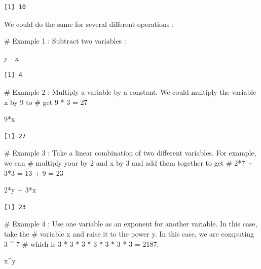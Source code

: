 \documentclass[
  letterpaper,
  DIV=11,
  numbers=noendperiod]{scrreprt}
\newenvironment{Shaded}{\begin{snugshade}}{\end{snugshade}}
\newcommand{\CommentTok}[1]{\textcolor[rgb]{0.37,0.37,0.37}{#1}}
\newcommand{\DecValTok}[1]{\textcolor[rgb]{0.68,0.00,0.00}{#1}}
\newcommand{\NormalTok}[1]{\textcolor[rgb]{0.00,0.23,0.31}{#1}}
\newcommand{\SpecialCharTok}[1]{\textcolor[rgb]{0.37,0.37,0.37}{#1}}
\begin{document}
\begin{verbatim}
[1] 10
\end{verbatim}

We could do the same for several different operations :

\begin{Shaded}
\begin{Highlighting}[]
\CommentTok{\# Example 1 : Subtract two variables :}

\NormalTok{y }\SpecialCharTok{{-}}\NormalTok{ x}
\end{Highlighting}
\end{Shaded}

\begin{verbatim}
[1] 4
\end{verbatim}

\begin{Shaded}
\begin{Highlighting}[]
\CommentTok{\# Example 2 : Multiply a variable by a constant. We could multiply the variable x by 9 to}
\CommentTok{\# get 9 * 3 = 27}

\DecValTok{9}\SpecialCharTok{*}\NormalTok{x}
\end{Highlighting}
\end{Shaded}

\begin{verbatim}
[1] 27
\end{verbatim}

\begin{Shaded}
\begin{Highlighting}[]
\CommentTok{\# Example 3 : Take a linear combination of two different variables. For example, we can}
\CommentTok{\# multiply your by 2 and x by 3 and add them together to get }
\CommentTok{\# 2*7 + 3*3 = 13 + 9 = 23 }

\DecValTok{2}\SpecialCharTok{*}\NormalTok{y }\SpecialCharTok{+} \DecValTok{3}\SpecialCharTok{*}\NormalTok{x}
\end{Highlighting}
\end{Shaded}

\begin{verbatim}
[1] 23
\end{verbatim}

\begin{Shaded}
\begin{Highlighting}[]
\CommentTok{\# Example 4 : Use one variable as an exponent for another variable. In this case, take the }
\CommentTok{\# variable x and raise it to the power y. In this case, we are computing 3 \^{} 7}
\CommentTok{\# which is 3 * 3 * 3 * 3 * 3 * 3 * 3 = 2187:}

\NormalTok{x}\SpecialCharTok{\^{}}\NormalTok{y}
\end{Highlighting}
\end{Shaded}
\end{document}
